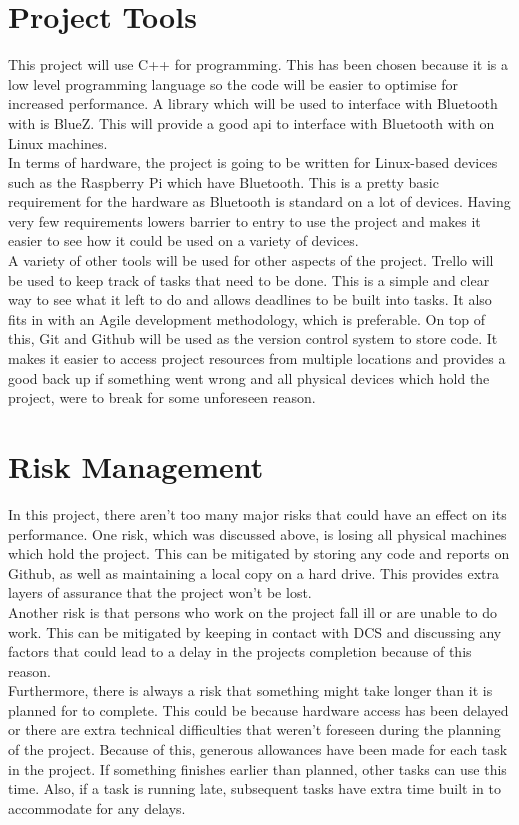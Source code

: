 \documentclass{report}
\begin{document}
\section*{Project Tools}

This project will use C++ for programming. This has been chosen because it is a low level programming language 
so the code will be easier to optimise for increased performance. A library which will be used to interface with Bluetooth with is BlueZ\cite{bluez}. This will 
provide a good api to interface with Bluetooth with on Linux machines.
\bigskip\\
In terms of hardware, the project is going to be written for Linux-based devices such as the Raspberry Pi which have 
Bluetooth. This is a pretty basic requirement for the hardware as Bluetooth is standard on a lot of devices. Having 
very few requirements lowers barrier to entry to use the project and makes it easier to see how it could 
be used on a variety of devices. 
\bigskip\\
A variety of other tools will be used for other aspects of the project. Trello will be used to keep track of tasks that 
need to be done. This is a simple and clear way to see what it left to do and allows deadlines to be built into tasks. It 
also fits in with an Agile development methodology, which is preferable. On top of this, Git and Github will be used as the version 
control system to store code. It makes it easier to access project resources from multiple locations and provides a good back 
up if something went wrong and all physical devices which hold the project, were to break for some unforeseen reason. 

\section*{Risk Management}

In this project, there aren't too many major risks that could have an effect on its performance. One risk, which was discussed 
above, is losing all physical machines which hold the project. This can be mitigated by storing any code and reports on Github, 
as well as maintaining a local copy on a hard drive. This provides extra layers of assurance that the project won't be lost. 
\bigskip\\
Another risk is that persons who work on the project fall ill or are unable to do work. This can be mitigated by keeping in 
contact with DCS and discussing any factors that could lead to a delay in the projects completion because of this reason.
\bigskip\\
Furthermore, there is always a risk that something might take longer than it is planned for to complete. This could be because hardware 
access has been delayed or there are extra technical difficulties that weren't foreseen during the planning of the project. Because of this, 
generous allowances have been made for each task in the project. If something finishes earlier than planned, other tasks can use this time. 
Also, if a task is running late, subsequent tasks have extra time built in to accommodate for any delays.
\end{document}
